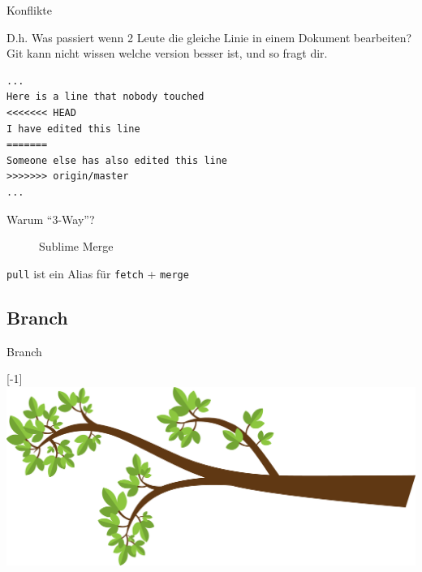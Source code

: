 \begin{frame}[fragile]{Konflikte}
	\begin{block}{}
	D.h. Was passiert wenn 2 Leute die gleiche Linie in einem Dokument bearbeiten?
	\\
	\pause
	\vspace{1em}
	Git kann nicht wissen welche version besser ist, und so fragt dir.
	\end{block}
	\begin{verbatim}
...
Here is a line that nobody touched
<<<<<<< HEAD
I have edited this line
=======
Someone else has also edited this line
>>>>>>> origin/master
...\end{verbatim}
\end{frame}
\begin{frame}{Warum ``3-Way''?}
	\begin{center}
	\begin{figure}
	\caption{Sublime Merge}
	\end{figure}
	\end{center}

	\pause
	\begin{center}
	\Large
	\texttt{pull} ist ein Alias f\"ur \texttt{fetch} + \texttt{merge}
	\end{center}
\end{frame}

\subsection{Branch}
\begin{frame}[c]{Branch}
	\begin{center}
	\scalebox{-1}[-1]{\includegraphics[width=\textwidth]{pic/treebranch}}
	\end{center}
\end{frame}


